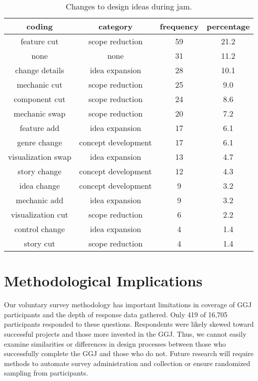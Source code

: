 \documentclass{sig-alternate}
\begin{document}
\begin{table}[tb]
\centering
\scriptsize
\begin{tabular}{|c|c|c|c|}
\hline coding & category & frequency & percentage \\ 
\hline feature cut & scope reduction & 59 & 21.2 \\ 
\hline none & none & 31 & 11.2 \\ 
\hline change details & idea expansion & 28 & 10.1 \\ 
\hline mechanic cut & scope reduction & 25 & 9.0 \\ 
\hline component cut & scope reduction & 24 & 8.6 \\ 
\hline mechanic swap & scope reduction & 20 & 7.2 \\ 
\hline feature add & idea expansion & 17 & 6.1 \\ 
\hline genre change & concept development & 17 & 6.1 \\ 
\hline visualization swap & idea expansion & 13 & 4.7 \\ 
\hline story change & concept development & 12 & 4.3 \\ 
\hline idea change & concept development & 9 & 3.2 \\ 
\hline mechanic add & idea expansion & 9 & 3.2 \\ 
\hline visualization cut & scope reduction & 6 & 2.2 \\ 
\hline control change & idea expansion & 4 & 1.4 \\ 
\hline story cut & scope reduction & 4 & 1.4 \\ 
\hline 
\end{tabular} 
\caption{Changes to design ideas during jam.}
\label{tab:idea_changes}
\end{table}

\section{Methodological Implications}
Our voluntary survey methodology has important limitations in coverage of GGJ participants and the depth of response data gathered. Only 419 of 16,705 participants responded to these questions. Respondents were likely skewed toward successful projects and those more invested in the GGJ. Thus, we cannot easily examine similarities or differences in design processes between those who successfully complete the GGJ and those who do not. Future research will require methods to automate survey administration and collection or ensure randomized sampling from participants.
\end{document}
